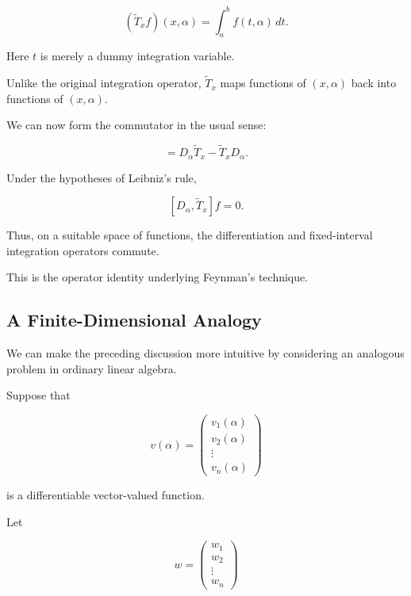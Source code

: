 \documentclass[11pt,a4paper]{article}
\theoremstyle{definition}
\theoremstyle{remark}
\begin{document}
\begin{equation}
    (\widetilde{T}_x f)(x,\alpha)
    =
    \int_a^b f(t,\alpha)\,dt.
    \label{eq:extended_integration_operator}
\end{equation}

Here $t$ is merely a
dummy integration variable.

Unlike the original
integration operator,
$\widetilde{T}_x$ maps
functions of $(x,\alpha)$
back into functions of
$(x,\alpha)$.

We can now form the
commutator in the
usual sense:

\begin{equation}
    [D_\alpha,\widetilde{T}_x]
    =
    D_\alpha\widetilde{T}_x
    -
    \widetilde{T}_xD_\alpha.
    \label{eq:feynman_commutator}
\end{equation}

Under the hypotheses
of Leibniz's rule,

\begin{equation}
    \boxed{
    [D_\alpha,\widetilde{T}_x]f=0.
    }
    \label{eq:vanishing_commutator}
\end{equation}

Thus, on a suitable
space of functions,
the differentiation
and fixed-interval
integration operators
commute.

This is the operator
identity underlying
Feynman's technique.

\subsection{A Finite-Dimensional Analogy}

We can make the preceding
discussion more intuitive
by considering an analogous
problem in ordinary
linear algebra.

Suppose that

\[
    v(\alpha)=
    \begin{pmatrix}
        v_1(\alpha)\\
        v_2(\alpha)\\
        \vdots\\
        v_n(\alpha)
    \end{pmatrix}
\]

is a differentiable
vector-valued function.

Let

\[
    w=
    \begin{pmatrix}
        w_1\\
        w_2\\
        \vdots\\
        w_n
    \end{pmatrix}
\]
\end{document}
